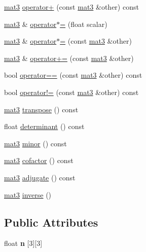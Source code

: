 \begin{DoxyCompactItemize}
\hyperlink{structmath_1_1mat3}{mat3} \hyperlink{structmath_1_1mat3_a643b20e5dae6db81c2912901b02b055a}{operator+} (const \hyperlink{structmath_1_1mat3}{mat3} \&other) const
\item 
\hyperlink{structmath_1_1mat3}{mat3} \& \hyperlink{structmath_1_1mat3_a9cf55c93334087cdbece61620de3e68a}{operator$\ast$=} (float scalar)
\item 
\hyperlink{structmath_1_1mat3}{mat3} \& \hyperlink{structmath_1_1mat3_ab1e15ead9ade7f9d51a5cec22a569df2}{operator$\ast$=} (const \hyperlink{structmath_1_1mat3}{mat3} \&other)
\item 
\hyperlink{structmath_1_1mat3}{mat3} \& \hyperlink{structmath_1_1mat3_a7517611ee9bfdee69f05000296afa06c}{operator+=} (const \hyperlink{structmath_1_1mat3}{mat3} \&other)
\item 
bool \hyperlink{structmath_1_1mat3_a48229882fcbf1ed5c8e4a04080ce4953}{operator==} (const \hyperlink{structmath_1_1mat3}{mat3} \&other) const
\item 
bool \hyperlink{structmath_1_1mat3_a7c066c801ee697d900546606676b976a}{operator!=} (const \hyperlink{structmath_1_1mat3}{mat3} \&other) const
\item 
\hyperlink{structmath_1_1mat3}{mat3} \hyperlink{structmath_1_1mat3_a9b381439856d95b51c8b87f80ece05dc}{transpose} () const
\item 
float \hyperlink{structmath_1_1mat3_a46cd8291370c457e4a7395b03f46588a}{determinant} () const
\item 
\hyperlink{structmath_1_1mat3}{mat3} \hyperlink{structmath_1_1mat3_a023a7c3f0beababef2e8637fd008d20f}{minor} () const
\item 
\hyperlink{structmath_1_1mat3}{mat3} \hyperlink{structmath_1_1mat3_a5b556e78be410428a8e74036fb6b8529}{cofactor} () const
\item 
\hyperlink{structmath_1_1mat3}{mat3} \hyperlink{structmath_1_1mat3_a382378d1fb1e2fd8201da87ccb63f3e8}{adjugate} () const
\item 
\hyperlink{structmath_1_1mat3}{mat3} \hyperlink{structmath_1_1mat3_af25e86e0941c58e80aa3f9c7c06567d9}{inverse} ()
\end{DoxyCompactItemize}
\subsection*{Public Attributes}
\begin{DoxyCompactItemize}
\item 
\mbox{\label{structmath_1_1mat3_af2ea003ef97664ec69b9ebfccbc734cd}} 
float {\bfseries n} \mbox{[}3\mbox{]}\mbox{[}3\mbox{]}
\end{DoxyCompactItemize}

